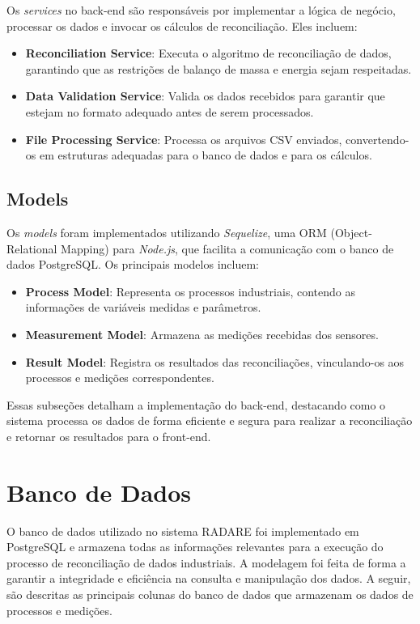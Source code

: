 Os \textit{services} no back-end são responsáveis por implementar a lógica de negócio, processar os dados e invocar os cálculos de reconciliação. Eles incluem:

\begin{itemize} \item \textbf{Reconciliation Service}: Executa o algoritmo de reconciliação de dados, garantindo que as restrições de balanço de massa e energia sejam respeitadas. \item \textbf{Data Validation Service}: Valida os dados recebidos para garantir que estejam no formato adequado antes de serem processados. \item \textbf{File Processing Service}: Processa os arquivos CSV enviados, convertendo-os em estruturas adequadas para o banco de dados e para os cálculos. \end{itemize}

\subsection{Models}

Os \textit{models} foram implementados utilizando \textit{Sequelize}, uma ORM (Object-Relational Mapping) para \textit{Node.js}, que facilita a comunicação com o banco de dados PostgreSQL. Os principais modelos incluem:

\begin{itemize} \item \textbf{Process Model}: Representa os processos industriais, contendo as informações de variáveis medidas e parâmetros. \item \textbf{Measurement Model}: Armazena as medições recebidas dos sensores. \item \textbf{Result Model}: Registra os resultados das reconciliações, vinculando-os aos processos e medições correspondentes. \end{itemize}

Essas subseções detalham a implementação do back-end, destacando como o sistema processa os dados de forma eficiente e segura para realizar a reconciliação e retornar os resultados para o front-end.

\section{Banco de Dados}

O banco de dados utilizado no sistema RADARE foi implementado em PostgreSQL e armazena todas as informações relevantes para a execução do processo de reconciliação de dados industriais. A modelagem foi feita de forma a garantir a integridade e eficiência na consulta e manipulação dos dados. A seguir, são descritas as principais colunas do banco de dados que armazenam os dados de processos e medições.

